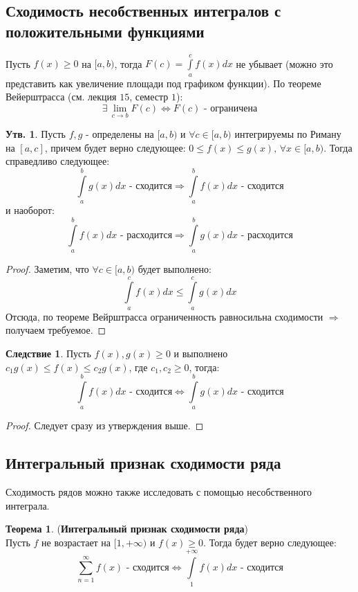 \documentclass[12pt]{article}
\theoremstyle{definition}
\newtheorem{prop}{Утв.}
\newtheorem{theorem}{Теорема}
\newtheorem{corollary}{Следствие}
\newcommand{\ddint}[2]{\displaystyle\int\limits_{#1}^{#2}}
\begin{document}
\subsection*{Сходимость несобственных интегралов с положительными функциями}
Пусть $f(x) \geq 0$ на $[a,b)$, тогда $F(c) = \ddint{a}{c}f(x)dx$ не убывает (можно это представить как увеличение площади под графиком функции). По теореме Вейерштрасса (см. лекция $15$, семестр $1$): 
$$
	\exists \, \lim\limits_{c \to b} F(c) \Leftrightarrow F(c) \text{ - ограничена}
$$	
\begin{prop}
	Пусть $f,g$ - определены на $[a,b)$ и $\forall c \in [a,b)$ интегрируемы по Риману на $[a,c]$, причем будет верно следующее: $0 \leq f(x) \leq g(x), \, \forall x \in [a,b)$. Тогда справедливо следующее: 
	$$
		\ddint{a}{b}g(x)dx \text{ - сходится} \Rightarrow \ddint{a}{b}f(x)dx \text{ - сходится}
	$$ 
	и наоборот:
	$$
		\ddint{a}{b}f(x)dx \text{ - расходится} \Rightarrow \ddint{a}{b}g(x)dx \text{ - расходится}
	$$
\end{prop}
\begin{proof}
	Заметим, что $\forall c \in [a,b)$ будет выполнено:
	$$
		\ddint{a}{c} f(x)dx \leq \ddint{a}{c} g(x)dx
	$$
	Отсюда, по теореме Вейрштрасса ограниченность равносильна сходимости $\Rightarrow$ получаем требуемое.
\end{proof}

\begin{corollary}
	Пусть $f(x),g(x) \geq 0$ и выполнено $c_1 g(x)\leq f(x) \leq c_2 g(x)$, где $c_1,c_2 \geq 0$, тогда:
	$$
		\ddint{a}{b}f(x)dx \text{ - сходится} \Leftrightarrow \ddint{a}{b}g(x)dx \text{ - сходится}
	$$
\end{corollary}
\begin{proof}
	Следует сразу из утверждения выше.
\end{proof}

\newpage
\subsection*{Интегральный признак сходимости ряда}
Сходимость рядов можно также исследовать с помощью несобственного интеграла.
\begin{theorem}(\textbf{Интегральный признак сходимости ряда})\hfill\\
	Пусть $f$ не возрастает на $[1, +\infty)$ и $f(x) \geq 0$. Тогда будет верно следующее:
	$$
		\sum\limits_{n=1}^{\infty}f(x) \text{ - сходится} \Leftrightarrow \ddint{1}{+\infty}f(x)dx \text{ - сходится}
	$$
\end{theorem}
\end{document}
